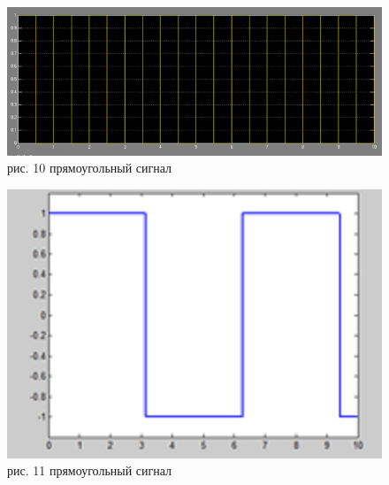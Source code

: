 \documentclass[10pt,a4paper]{report}
\begin{document}
\begin{figure}
\begin{center}
\includegraphics[angle=0, scale = 0.7]{10.png}\newline
рис. 10  прямоугольный сигнал\newline
\end{center}
\end{figure}


\begin{figure}
\begin{center}
\includegraphics[angle=0, scale = 0.7]{11.png}\newline
рис. 11  прямоугольный сигнал\newline
\end{center}
\end{figure}
\end{document}
